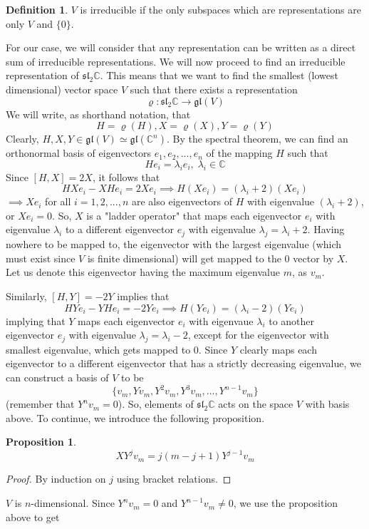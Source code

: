 \documentclass{article}
\newtheorem{proposition}[theorem]{Proposition}
\theoremstyle{remark}
\theoremstyle{definition}
\newtheorem{definition}{Definition}[section]
\begin{document}
\begin{definition}
$V$ is irreducible if the only subspaces which are representations are only $V$ and $\{0\}$. 
\end{definition}
For our case, we will consider that any representation can be written as a direct sum of irreducible representations. We will now proceed to find an irreducible representation of $\mathfrak{sl}_2 \mathbb{C}$. This means that we want to find the smallest (lowest dimensional) vector space $V$ such that there exists a representation
\[\varrho: \mathfrak{sl}_2 \mathbb{C} \longrightarrow \mathfrak{gl}(V)\]
We will write, as shorthand notation, that 
\[H = \varrho(H), X = \varrho(X), Y = \varrho(Y)\]
Clearly, $H, X, Y \in \mathfrak{gl}(V) \simeq \mathfrak{gl}(\mathbb{C}^n)$. By the spectral theorem, we can find an orthonormal basis of eigenvectors $e_1, e_2, ..., e_n$ of the mapping $H$ such that
\[H e_i = \lambda_i e_i, \; \lambda_i \in \mathbb{C}\]
Since $[H,X] = 2X$, it follows that
\[HX e_i - X H e_i = 2X e_i \implies H (X e_i) = (\lambda_i + 2) (X e_i)\]
$\implies Xe_i$ for all $i = 1, 2, ..., n$ are also eigenvectors of $H$ with eigenvalue $(\lambda_i + 2)$, or $X e_i = 0$. So, $X$ is a "ladder operator" that maps each eigenvector $e_i$ with eigenvalue $\lambda_i$ to a different eigenvector $e_j$ with eigenvalue $\lambda_j = \lambda_i + 2$. Having nowhere to be mapped to, the eigenvector with the largest eigenvalue (which must exist since $V$ is finite dimensional) will get mapped to the $0$ vector by $X$. Let us denote this eigenvector having the maximum eigenvalue $m$, as $v_m$. 

Similarly, $[H,Y] = -2Y$ implies that
\[HY e_i - YH e_i = -2Y e_i \implies H(Y e_i) = (\lambda_i - 2)(Y e_i)\]
implying that $Y$ maps each eigenvector $e_i$ with eigenvaue $\lambda_i$ to another eigenvector $e_j$ with eigenvalue $\lambda_j = \lambda_i - 2$, except for the eigenvector with smallest eigenvalue, which gets mapped to $0$. Since $Y$ clearly maps each eigenvector to a different eigenvector that has a strictly decreasing eigenvalue, we can construct a basis of $V$ to be
\[\{v_m, Y v_m, Y^2 v_m, Y^3 v_m, ..., Y^{n-1} v_m\}\]
(remember that $Y^n v_m = 0$). So, elements of $\mathfrak{sl}_2 \mathbb{C}$ acts on the space $V$ with basis above. To continue, we introduce the following proposition. 
\begin{proposition}
\[X Y^j v_m = j(m-j+1) Y^{j-1} v_m\]
\end{proposition}
\begin{proof}
By induction on $j$ using bracket relations.
\end{proof}
$V$ is $n$-dimensional. Since $Y^n v_m = 0$ and $Y^{n-1} v_m \neq 0$, we use the proposition above to get
\end{document}
